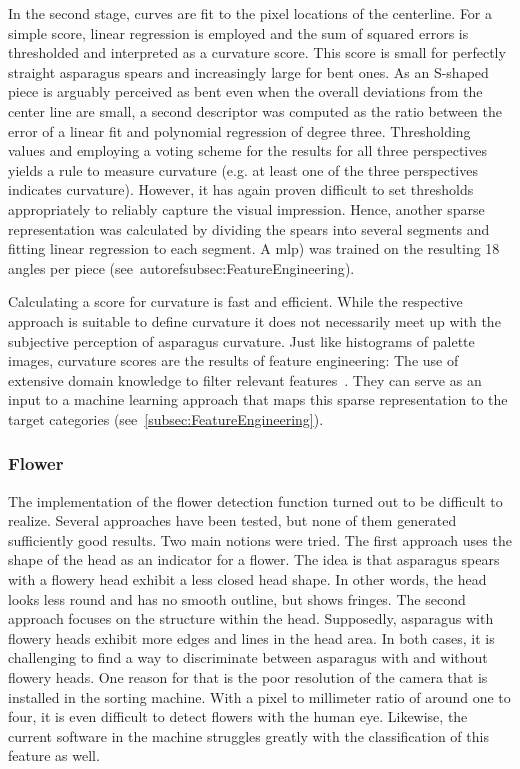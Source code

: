 In the second stage, curves are fit to the pixel locations of the centerline. For a simple score, linear regression is employed and the sum of squared errors is thresholded and interpreted as a curvature score. This score is small for perfectly straight asparagus spears and increasingly large for bent ones. As an S-shaped piece is arguably perceived as bent even when the overall deviations from the center line are small, a second descriptor was computed as the ratio between the error of a linear fit and polynomial regression of degree three. Thresholding values and employing a voting scheme for the results for all three perspectives yields a rule to measure curvature (e.g. at least one of the three perspectives indicates curvature). However, it has again proven difficult to set thresholds appropriately to reliably capture the visual impression. Hence, another sparse representation was calculated by dividing the spears into several segments and fitting linear regression to each segment. A \acrfull{mlp}) was trained on the resulting 18 angles per piece (see~autoref{subsec:FeatureEngineering}).

\bigskip
Calculating a score for curvature is fast and efficient. While the respective approach is suitable to define curvature it does not necessarily meet up with the subjective perception of asparagus curvature. Just like histograms of palette images, curvature scores are the results of feature engineering: The use of extensive domain knowledge to filter relevant features~\citep{zheng2018feature}. They can serve as an input to a machine learning approach that maps this sparse representation to the target categories (see~\autoref{subsec:FeatureEngineering}).


\subsubsection{Flower}
\label{subsec:Flower}

The implementation of the flower detection function turned out to be difficult to realize. Several approaches have been tested, but none of them generated sufficiently good results. Two main notions were tried. The first approach uses the shape of the head as an indicator for a flower. The idea is that asparagus spears with a flowery head exhibit a less closed head shape. In other words, the head looks less round and has no smooth outline, but shows fringes. The second approach focuses on the structure within the head. Supposedly, asparagus with flowery heads exhibit more edges and lines in the head area. In both cases, it is challenging to find a way to discriminate between asparagus with and without flowery heads. One reason for that is the poor resolution of the camera that is installed in the sorting machine. With a pixel to millimeter ratio of around one to four, it is even difficult to detect flowers with the human eye. Likewise, the current software in the machine struggles greatly with the classification of this feature as well.


